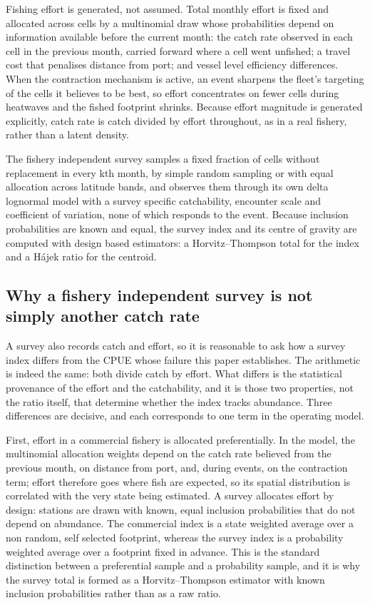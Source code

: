 \documentclass[
  11pt,
  a4paper,
]{article}
\begin{document}
Fishing effort is generated, not assumed. Total monthly effort is fixed
and allocated across cells by a multinomial draw whose probabilities
depend on information available before the current month: the catch rate
observed in each cell in the previous month, carried forward where a
cell went unfished; a travel cost that penalises distance from port; and
vessel level efficiency differences. When the contraction mechanism is
active, an event sharpens the fleet's targeting of the cells it believes
to be best, so effort concentrates on fewer cells during heatwaves and
the fished footprint shrinks. Because effort magnitude is generated
explicitly, catch rate is catch divided by effort throughout, as in a
real fishery, rather than a latent density.

The fishery independent survey samples a fixed fraction of cells without
replacement in every kth month, by simple random sampling or with equal
allocation across latitude bands, and observes them through its own
delta lognormal model with a survey specific catchability, encounter
scale and coefficient of variation, none of which responds to the event.
Because inclusion probabilities are known and equal, the survey index
and its centre of gravity are computed with design based estimators: a
Horvitz--Thompson total for the index and a Hájek ratio for the
centroid.

\hypertarget{why-a-fishery-independent-survey-is-not-simply-another-catch-rate}{%
\subsection{Why a fishery independent survey is not simply another catch
rate}\label{why-a-fishery-independent-survey-is-not-simply-another-catch-rate}}

A survey also records catch and effort, so it is reasonable to ask how a
survey index differs from the CPUE whose failure this paper establishes.
The arithmetic is indeed the same: both divide catch by effort. What
differs is the statistical provenance of the effort and the
catchability, and it is those two properties, not the ratio itself, that
determine whether the index tracks abundance. Three differences are
decisive, and each corresponds to one term in the operating model.

First, effort in a commercial fishery is allocated preferentially. In
the model, the multinomial allocation weights depend on the catch rate
believed from the previous month, on distance from port, and, during
events, on the contraction term; effort therefore goes where fish are
expected, so its spatial distribution is correlated with the very state
being estimated. A survey allocates effort by design: stations are drawn
with known, equal inclusion probabilities that do not depend on
abundance. The commercial index is a state weighted average over a non
random, self selected footprint, whereas the survey index is a
probability weighted average over a footprint fixed in advance. This is
the standard distinction between a preferential sample and a probability
sample, and it is why the survey total is formed as a Horvitz--Thompson
estimator with known inclusion probabilities rather than as a raw ratio.
\end{document}
